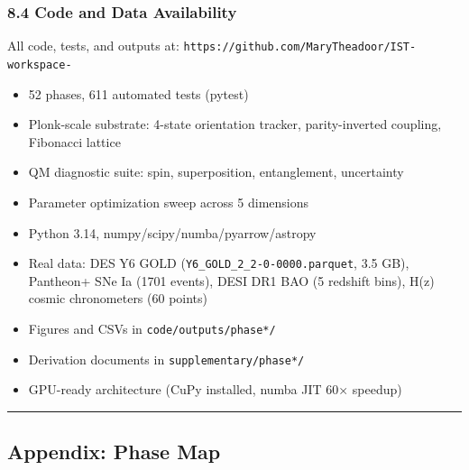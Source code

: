 \documentclass[
]{article}
\providecommand{\tightlist}{%
  \setlength{\itemsep}{0pt}\setlength{\parskip}{0pt}}
\begin{document}
\subsubsection{8.4 Code and Data
Availability}\label{code-and-data-availability}

All code, tests, and outputs at:
\texttt{https://github.com/MaryTheadoor/IST-workspace-}

\begin{itemize}
\tightlist
\item
  52 phases, 611 automated tests (pytest)
\item
  Plonk-scale substrate: 4-state orientation tracker, parity-inverted
  coupling, Fibonacci lattice
\item
  QM diagnostic suite: spin, superposition, entanglement, uncertainty
\item
  Parameter optimization sweep across 5 dimensions
\item
  Python 3.14, numpy/scipy/numba/pyarrow/astropy
\item
  Real data: DES Y6 GOLD (\texttt{Y6\_GOLD\_2\_2-0-0000.parquet}, 3.5
  GB), Pantheon+ SNe Ia (1701 events), DESI DR1 BAO (5 redshift bins),
  H(z) cosmic chronometers (60 points)
\item
  Figures and CSVs in \texttt{code/outputs/phase*/}
\item
  Derivation documents in \texttt{supplementary/phase*/}
\item
  GPU-ready architecture (CuPy installed, numba JIT 60× speedup)
\end{itemize}

\begin{center}\rule{0.5\linewidth}{0.5pt}\end{center}

\subsection{Appendix: Phase Map}\label{appendix-phase-map}
\end{document}
